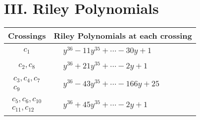 \documentclass[1p]{elsarticle_modified}
\theoremstyle{definition}
\begin{document}
\centering \section*{ III. Riley Polynomials}
\begin{tabular}{m{50pt}|m{274pt}}
Crossings & \hspace{64pt}Riley Polynomials at each crossing \\
\hline $$\begin{aligned}c_{1}\end{aligned}$$&$\begin{aligned}
&y^{36}-11 y^{35}+\cdots-30 y+1
\end{aligned}$\\
\hline $$\begin{aligned}c_{2},c_{8}\end{aligned}$$&$\begin{aligned}
&y^{36}+21 y^{35}+\cdots-2 y+1
\end{aligned}$\\
\hline $$\begin{aligned}c_{3},c_{4},c_{7}\\c_{9}\end{aligned}$$&$\begin{aligned}
&y^{36}-43 y^{35}+\cdots-166 y+25
\end{aligned}$\\
\hline $$\begin{aligned}c_{5},c_{6},c_{10}\\c_{11},c_{12}\end{aligned}$$&$\begin{aligned}
&y^{36}+45 y^{35}+\cdots-2 y+1
\end{aligned}$\\
\hline
\end{tabular}
\vskip 2pc
\end{document}
